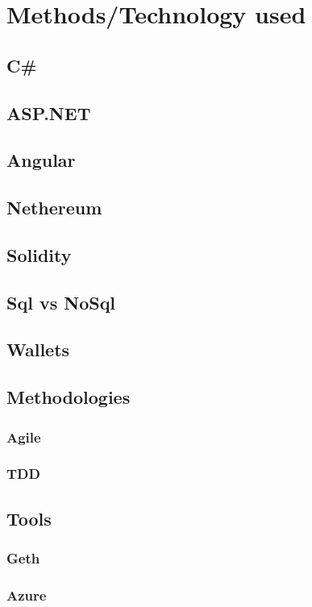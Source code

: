 \documentclass[12pt]{report}
\begin{document}
\chapter{Methods/Technology used}

\section{C\#}
\section{ASP.NET}
\section{Angular}
\section{Nethereum}
\section{Solidity}
\section{Sql vs NoSql}
\section{Wallets}

\section{Methodologies}
\subsection{Agile}
\subsection{TDD}

\section{Tools}
\subsection{Geth}
\subsection{Azure}
\end{document}
